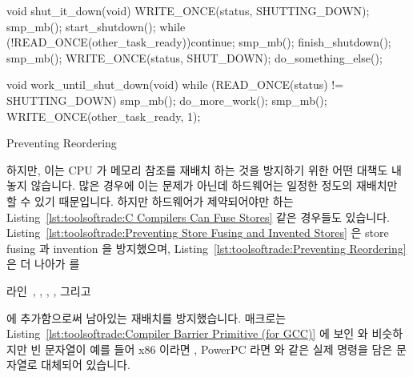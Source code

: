 \begin{listing}[tbp]
\begin{fcvlabel}
\begin{VerbatimL}[commandchars=\\\[\]]
void shut_it_down(void)
{
	WRITE_ONCE(status, SHUTTING_DOWN);
	smp_mb(); \lnlbl[mb1]
	start_shutdown();
	while (!READ_ONCE(other_task_ready))\lnlbl[loop:b]
		continue;
	smp_mb(); \lnlbl[mb2]
	finish_shutdown();
	smp_mb(); \lnlbl[mb3]
	WRITE_ONCE(status, SHUT_DOWN);
	do_something_else();
}

void work_until_shut_down(void)
{
	while (READ_ONCE(status) != SHUTTING_DOWN) {
		smp_mb(); \lnlbl[mb4]
		do_more_work();
	}
	smp_mb(); \lnlbl[mb5]
	WRITE_ONCE(other_task_ready, 1);
}
\end{VerbatimL}
\end{fcvlabel}
\caption{Preventing Reordering}
\label{lst:toolsoftrade:Preventing Reordering}
\end{listing}

하지만, 이는 CPU 가 메모리 참조를 재배치 하는 것을 방지하기 위한 어떤 대책도
내놓지 않습니다.
많은 경우에 이는 문제가 아닌데 하드웨어는 일정한 정도의 재배치만 할 수 있기
때문입니다.
하지만 하드웨어가 제약되어야만 하는
Listing~\ref{lst:toolsoftrade:C Compilers Can Fuse Stores}
같은 경우들도 있습니다.
Listing~\ref{lst:toolsoftrade:Preventing Store Fusing and Invented Stores}
은 store fusing 과 invention 을 방지했으며,
Listing~\ref{lst:toolsoftrade:Preventing Reordering}
은 더 나아가  를
\begin{fcvref}
라인~, , , ,
그리고~
\end{fcvref}
에 추가함으로써 남아있는 재배치를 방지했습니다.
 매크로는
Listing~\ref{lst:toolsoftrade:Compiler Barrier Primitive (for GCC)}
에 보인  와 비슷하지만 빈 문자열이 예를 들어 x86 이라면
, PowerPC 라면  와 같은 실제 명령을 담은 문자열로
대체되어 있습니다.

